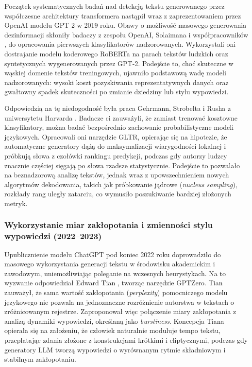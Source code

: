 Początek systematycznych badań nad detekcją tekstu generowanego przez współczesne architektury transformera nastąpił wraz z zaprezentowaniem przez OpenAI modelu GPT-2 w 2019 roku. Obawy o możliwość masowego generowania dezinformacji skłoniły badaczy z zespołu OpenAI, Solaimana i współpracowników \cite{solaiman2019release}, do opracowania pierwszych klasyfikatorów nadzorowanych. Wykorzystali oni dostrajanie modelu koderowego RoBERTa na parach tekstów ludzkich oraz syntetycznych wygenerowanych przez GPT-2. Podejście to, choć skuteczne w wąskiej domenie tekstów treningowych, ujawniło podstawową wadę modeli nadzorowanych: wysoki koszt pozyskiwania reprezentatywnych danych oraz gwałtowny spadek skuteczności po zmianie dziedziny lub stylu wypowiedzi.

Odpowiedzią na tę niedogodność była praca Gehrmann, Strobelta i Rusha z uniwersytetu Harvarda \cite{gehrmann2019gltr}. Badacze ci zauważyli, że zamiast trenować kosztowne klasyfikatory, można badać bezpośrednio zachowanie probabilistyczne modeli językowych. Opracowali oni narzędzie GLTR, opierając się na hipotezie, że automatyczne generatory dążą do maksymalizacji wiarygodności lokalnej i próbkują słowa z czołówki rankingu predykcji, podczas gdy autorzy ludzcy znacznie częściej sięgają po słowa rzadsze statystycznie. Podejście to pozwalało na beznadzorową analizę tekstów, jednak wraz z upowszechnieniem nowych algorytmów dekodowania, takich jak próbkowanie jądrowe (\textit{nucleus sampling}), rozkłady rang uległy zatarciu, co wymusiło poszukiwanie bardziej złożonych metryk.

\subsubsection{Wykorzystanie miar zakłopotania i zmienności stylu wypowiedzi (2022--2023)}

Upublicznienie modelu ChatGPT pod koniec 2022 roku doprowadziło do masowego wykorzystania generacji tekstu w środowisku akademickim i zawodowym, uniemożliwiając poleganie na wczesnych heurystykach. Na to wyzwanie odpowiedział Edward Tian \cite{gptzero2023}, tworząc narzędzie GPTZero. Tian zauważył, że sama wartość zakłopotania (\textit{perplexity}) pomocniczego modelu językowego nie pozwala na jednoznaczne rozróżnienie autorstwa w tekstach o zróżnicowanym rejestrze. Zaproponował więc połączenie miary zakłopotania z analizą dynamiki wypowiedzi, określaną jako \textit{burstiness}. Koncepcja Tiana opierała się na założeniu, że człowiek naturalnie moduluje tempo tekstu, przeplatając zdania złożone z konstrukcjami krótkimi i eliptycznymi, podczas gdy generatory LLM tworzą wypowiedzi o wyrównanym rytmie składniowym i stabilnym zakłopotaniu.

